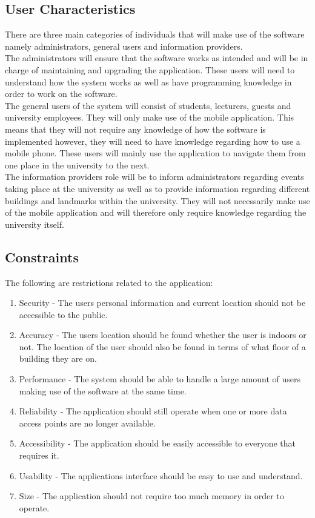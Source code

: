 \documentclass[12pt,a4paper]{report}
\begin{document}
\subsection*{User Characteristics}
There are three main categories of individuals that will make use of the software namely administrators, general users and information providers.
	\\		

		
	The administrators will ensure that the software works as intended and will be in charge of maintaining and upgrading the application. These users will need to understand how the system works as well as have programming knowledge in order to work on the software.  
	\\

	The general users of the system will consist of students, lecturers, guests and university employees. They will only make use of the mobile application. This means that they will not require any knowledge of how the software is implemented however, they will need to have knowledge regarding how to use a mobile phone. These users will mainly use the application to navigate them from one place in the university to the next.
	\\

	The information providers role will be to inform administrators regarding events taking place at the university as well as to provide information regarding different buildings and landmarks within the university. They will not necessarily make use of the mobile application and will therefore only require knowledge regarding the university itself.
	
	\subsection*{Constraints}
	The following are restrictions related to the application:
		\begin{enumerate}
				\renewcommand{\labelenumi}{{\textbf{\arabic{enumi}.}}}
				\item Security  - The users personal information and current location should not be accessible to the public.
				\item Accuracy - The users location should be found whether the user is indoors or not. The location of the user should also be found in terms of what floor of a building they are on.
				\item Performance - The system should be able to handle a large amount of users making use of the software at the same time.
				\item Reliability - The application should still operate when one or more data access points are no longer available.
				\item Accessibility - The application should be easily accessible to everyone that requires it.
				\item Usability - The applications interface should be easy to use and understand.
				\item Size - The application should not require too much memory in order to operate.
				\end{enumerate}
\end{document}
